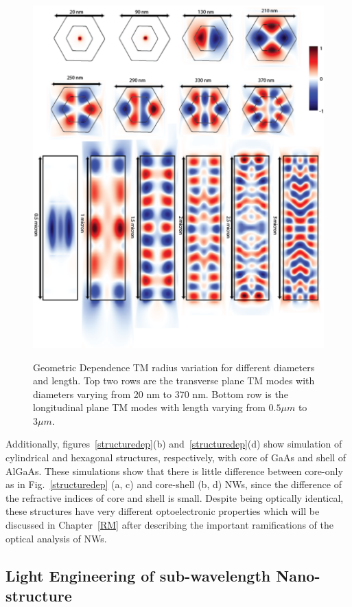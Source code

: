 \begin{figure}
  \caption{Geometric Dependence TM radius variation for different diameters and length. Top two rows are the transverse plane TM modes with diameters varying from 20 nm to 370 nm. Bottom row is the longitudinal plane TM modes with length varying from $0.5 \mu{m}$ to $3 \mu{m}$.}
  \centering
  \includegraphics[width=\textwidth]{pictures/LM/TMRadius}
  \label{TMRadius}
\end{figure}

Additionally, figures~\ref{structuredep}(b) and~\ref{structuredep}(d) show
simulation of cylindrical and hexagonal structures, respectively, with core of
GaAs and shell of AlGaAs. These simulations show that there is little
difference between core-only as in Fig.~\ref{structuredep} (a, c) and
core-shell (b, d) NWs, since the difference of the refractive indices of core
and shell is small. Despite being optically identical, these structures have
very different optoelectronic properties which will be discussed in
Chapter~\ref{RM} after describing the important ramifications of the optical
analysis of NWs.

\subsection{Light Engineering of sub-wavelength Nano-structure}

